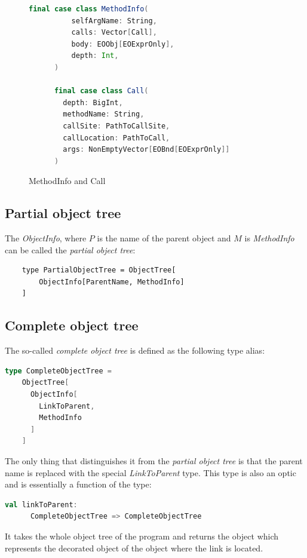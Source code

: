 \begin{figure}
    \begin{lstlisting}[language=Scala]
      final case class MethodInfo(
          selfArgName: String,
          calls: Vector[Call],
          body: EOObj[EOExprOnly],
          depth: Int,
      )
          
      final case class Call(
        depth: BigInt,
        methodName: String,
        callSite: PathToCallSite,
        callLocation: PathToCall,
        args: NonEmptyVector[EOBnd[EOExprOnly]]
      )
    \end{lstlisting}
    \caption{MethodInfo and Call}
    \label{fig:methodinfo}
\end{figure}

\subsection{Partial object tree}
The \textit{ObjectInfo}, where $P$ is the name of the parent object and $M$ is \textit{MethodInfo} can be called the \textit{partial object tree}:
\begin{lstlisting}
    type PartialObjectTree = ObjectTree[
        ObjectInfo[ParentName, MethodInfo]
    ]

\end{lstlisting}

\subsection{Complete object tree}
\label{impl:complete_object_tree}
The so-called \textit{complete object tree} is defined as the following type alias:
\begin{lstlisting}[language=Scala]
  type CompleteObjectTree =
    ObjectTree[
      ObjectInfo[
        LinkToParent,
        MethodInfo
      ]
    ]
\end{lstlisting}
The only thing that distinguishes it from the \textit{partial object tree} is that the parent name is replaced with the special \textit{LinkToParent} type. This type is also an optic \cite{optics} and is essentially a function of the type:
\begin{lstlisting}[language=Scala]
    val linkToParent: 
      CompleteObjectTree => CompleteObjectTree
\end{lstlisting}
It takes the whole object tree of the program and returns the object which represents the decorated object of the object where the link is located.



